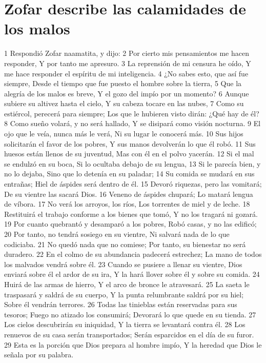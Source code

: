 \section*{Zofar describe las calamidades de los malos}

1 Respondió Zofar naamatita, y dijo:
2 Por cierto mis pensamientos me hacen responder,
Y por tanto me apresuro.
3 La reprensión de mi censura he oído,
Y me hace responder el espíritu de mi inteligencia.
4 ¿No sabes esto, que así fue siempre,
Desde el tiempo que fue puesto el hombre sobre la tierra,
5 Que la alegría de los malos es breve,
Y el gozo del impío por un momento?
6 Aunque subiere su altivez hasta el cielo,
Y su cabeza tocare en las nubes,
7 Como su estiércol, perecerá para siempre;
Los que le hubieren visto dirán: ¿Qué hay de él?
8 Como sueño volará, y no será hallado,
Y se disipará como visión nocturna.
9 El ojo que le veía, nunca más le verá,
Ni su lugar le conocerá más.
10 Sus hijos solicitarán el favor de los pobres,
Y sus manos devolverán lo que él robó. 
11 Sus huesos están llenos de su juventud,
Mas con él en el polvo yacerán.
12 Si el mal se endulzó en su boca,
Si lo ocultaba debajo de su lengua,
13 Si le parecía bien, y no lo dejaba,
Sino que lo detenía en su paladar;
14 Su comida se mudará en sus entrañas;
Hiel de áspides será dentro de él.
15 Devoró riquezas, pero las vomitará;
De su vientre las sacará Dios.
16 Veneno de áspides chupará;
Lo matará lengua de víbora.
17 No verá los arroyos, los ríos, 
Los torrentes de miel y de leche.
18 Restituirá el trabajo conforme a los bienes que tomó,
Y no los tragará ni gozará.
19 Por cuanto quebrantó y desamparó a los pobres,
Robó casas, y no las edificó;
20 Por tanto, no tendrá sosiego en su vientre,
Ni salvará nada de lo que codiciaba. 
21 No quedó nada que no comiese;
Por tanto, su bienestar no será duradero. 
22 En el colmo de su abundancia padecerá estrechez;
La mano de todos los malvados vendrá sobre él.
23 Cuando se pusiere a llenar su vientre,
Dios enviará sobre él el ardor de su ira,
Y la hará llover sobre él y sobre su comida.
24 Huirá de las armas de hierro,
Y el arco de bronce le atravesará.
25 La saeta le traspasará y saldrá de su cuerpo,
Y la punta relumbrante saldrá por su hiel;
Sobre él vendrán terrores.
26 Todas las tinieblas están reservadas para sus tesoros;
Fuego no atizado los consumirá;
Devorará lo que quede en su tienda.
27 Los cielos descubrirán su iniquidad,
Y la tierra se levantará contra él.
28 Los renuevos de su casa serán transportados;
Serán esparcidos en el día de su furor.
29 Esta es la porción que Dios prepara al hombre impío,
Y la heredad que Dios le señala por su palabra.


